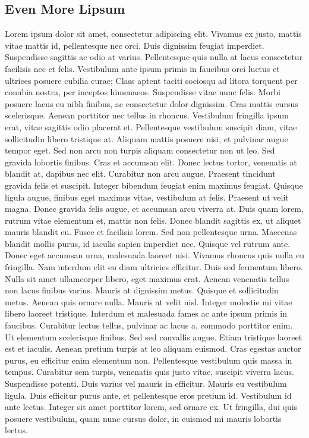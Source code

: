 \documentclass[ 6pt, a4paper, landscape ]{scrartcl}
\begin{document}
\begin{multicols}{4}
\begin{breakbox}
\subsection{Even More Lipsum}
Lorem ipsum dolor sit amet, consectetur adipiscing elit. Vivamus ex justo,
mattis vitae mattis id, pellentesque nec orci. Duis dignissim feugiat imperdiet.
Suspendisse sagittis ac odio at varius. Pellentesque quis nulla at lacus
consectetur facilisis nec et felis. Vestibulum ante ipsum primis in faucibus
orci luctus et ultrices posuere cubilia curae; Class aptent taciti sociosqu ad
litora torquent per conubia nostra, per inceptos himenaeos. Suspendisse vitae
nunc felis. Morbi posuere lacus eu nibh finibus, ac consectetur dolor dignissim.
Cras mattis cursus scelerisque. Aenean porttitor nec tellus in rhoncus.
Vestibulum fringilla ipsum erat, vitae sagittis odio placerat et. Pellentesque
vestibulum suscipit diam, vitae sollicitudin libero tristique at. Aliquam mattis
posuere nisi, et pulvinar augue tempor eget. Sed non arcu non turpis aliquam
consectetur non ut leo.
Sed gravida lobortis finibus. Cras et accumsan elit. Donec lectus tortor,
venenatis at blandit at, dapibus nec elit. Curabitur non arcu augue. Praesent
tincidunt gravida felis et suscipit. Integer bibendum feugiat enim maximus
feugiat. Quisque ligula augue, finibus eget maximus vitae, vestibulum at felis.
Praesent ut velit magna. Donec gravida felis augue, et accumsan arcu viverra at.
Duis quam lorem, rutrum vitae elementum et, mattis non felis. Donec blandit
sagittis ex, ut aliquet mauris blandit eu. Fusce et facilisis lorem. Sed non
pellentesque urna. Maecenas blandit mollis purus, id iaculis sapien imperdiet
nec.
Quisque vel rutrum ante. Donec eget accumsan urna, malesuada laoreet nisi.
Vivamus rhoncus quis nulla eu fringilla. Nam interdum elit eu diam ultricies
efficitur. Duis sed fermentum libero. Nulla sit amet ullamcorper libero, eget
maximus erat. Aenean venenatis tellus non lacus finibus varius. Mauris at
dignissim metus. Quisque et sollicitudin metus.
Aenean quis ornare nulla. Mauris at velit nisl. Integer molestie mi vitae libero
laoreet tristique. Interdum et malesuada fames ac ante ipsum primis in faucibus.
Curabitur lectus tellus, pulvinar ac lacus a, commodo porttitor enim. Ut
elementum scelerisque finibus. Sed sed convallis augue. Etiam tristique laoreet
est et iaculis.
Aenean pretium turpis at leo aliquam euismod. Cras egestas auctor purus, eu
efficitur enim elementum non. Pellentesque vestibulum quis massa in tempus.
Curabitur sem turpis, venenatis quis justo vitae, suscipit viverra lacus.
Suspendisse potenti. Duis varius vel mauris in efficitur. Mauris eu vestibulum
ligula. Duis efficitur purus ante, et pellentesque eros pretium id. Vestibulum
id ante lectus. Integer sit amet porttitor lorem, sed ornare ex. Ut fringilla,
dui quis posuere vestibulum, quam nunc cursus dolor, in euismod mi mauris
lobortis lectus.

	\end{breakbox}
	

\end{multicols}
\end{document}
